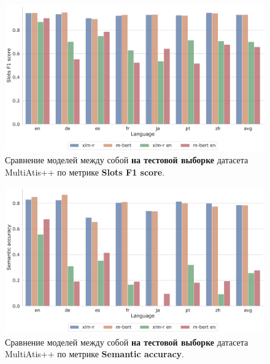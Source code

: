 \begin{figure}[h!]
    \centering
    \includegraphics[width=\textwidth]{images/1}
    \caption{Сравнение моделей между собой \textbf{на тестовой выборке} датасета MultiAtis++ по метрике \textbf{Slots F1 score}.}\label{fig:figure1}
\end{figure}
\begin{figure}[h!]
    \centering
    \includegraphics[width=\textwidth]{images/2}
    \caption{Сравнение моделей между собой \textbf{на тестовой выборке} датасета MultiAtis++ по метрике \textbf{Semantic accuracy}.}\label{fig:figure2}
\end{figure}

